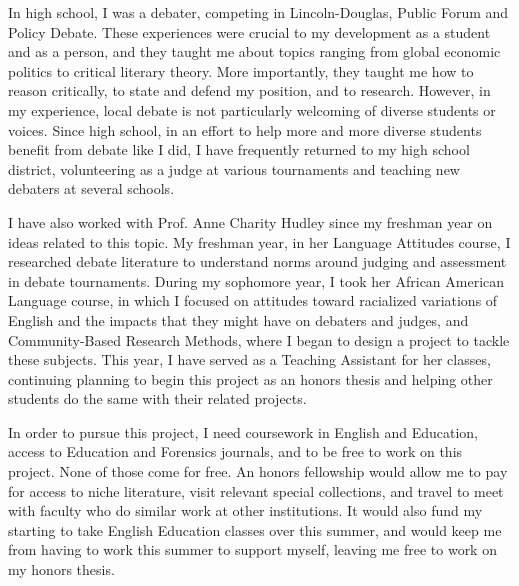 \documentclass[man,12pt,natbib]{apa6}
\begin{document}
In high school, I was a debater, competing in Lincoln-Douglas, Public Forum and
Policy Debate. These experiences were crucial to my development as a student
and as a person, and they taught me about topics ranging from global economic
politics to critical literary theory. More importantly, they taught me how to
reason critically, to state and defend my position, and to research. However,
in my experience, local debate is not particularly welcoming of diverse
students or voices. Since high school, in an effort to help more and more
diverse students benefit from debate like I did, I have frequently returned to
my high school district, volunteering as a judge at various tournaments and
teaching new debaters at several schools. 

I have also worked with Prof. Anne Charity Hudley since my freshman year on
ideas related to this topic. 
My freshman year, in her Language Attitudes course, I researched debate
literature to understand norms around judging and assessment in debate
tournaments. During my sophomore year, I took her African American Language
course, in which I focused on attitudes toward racialized variations of English and the impacts that they might have on
debaters and judges, and Community-Based Research Methods, where I began to
design a project to tackle these subjects. This year, I have served as a
Teaching Assistant for her classes, continuing planning to begin this project
as an honors thesis and helping other students do the same with their related
projects.

In order to pursue this project, I need coursework in English and Education,
access to Education and Forensics journals, and to be free to work on this
project. None of those come for free. An honors fellowship would allow me to
pay for access to niche literature, visit relevant special collections, and
travel to meet with faculty who do similar work at other institutions. It would
also fund my starting to take English Education classes over this summer, and
would keep me from having to work this summer to support myself, leaving me
free to work on my honors thesis.
\end{document}
